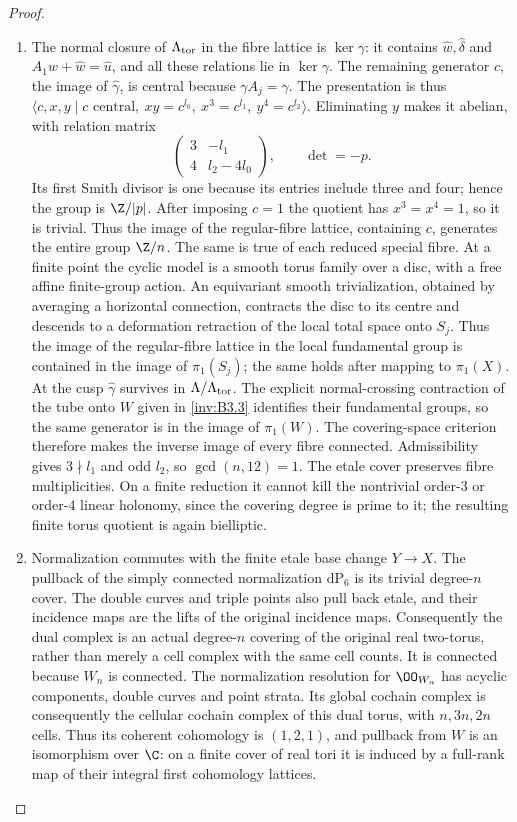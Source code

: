 \begin{proof}
\begin{enumerate}[label=\arabic*.,leftmargin=*]
\item The normal closure of $\Lambda_{\rm tor}$ in the fibre lattice is
$\ker\gamma$: it contains $\hat w,\hat\delta$ and
$A_1\hat w+\hat w=\hat u$, and all these relations lie in
$\ker\gamma$. The remaining generator $c$, the image of
$\hat\gamma$, is central because $\gamma A_j=\gamma$.
The presentation is thus
$\langle c,x,y\mid c\text{ central},\ xy=c^{l_0},\
x^3=c^{l_1},\ y^4=c^{l_2}\rangle$.
Eliminating $y$ makes it abelian, with relation matrix
\[
 \begin{pmatrix}3&-l_1\\4&l_2-4l_0\end{pmatrix},
 \qquad\det=-p.
\]
Its first Smith divisor is one because its entries include three
and four; hence the group is $\Z/|p|$.
After imposing $c=1$ the quotient has $x^3=x^4=1$, so it is trivial.
Thus the image of the regular-fibre lattice, containing $c$, generates
the entire group $\Z/n$. The same is true of each reduced special
fibre. At a finite point the cyclic model is a smooth torus family
over a disc, with a free affine finite-group action. An equivariant
smooth trivialization, obtained by averaging a horizontal connection,
contracts the disc to its centre and descends to a deformation
retraction of the local total space onto $S_j$. Thus the image of
the regular-fibre lattice in the local fundamental group is contained
in the image of $\pi_1(S_j)$; the same holds after mapping to
$\pi_1(X)$. At the cusp $\hat\gamma$ survives in
$\Lambda/\Lambda_{\rm tor}$. The explicit normal-crossing contraction
of the tube onto $W$ given in \ref{inv:B3.3} identifies their fundamental groups,
so the same generator is in the image of $\pi_1(W)$.
The covering-space criterion therefore makes the inverse image of
every fibre connected. Admissibility gives $3\nmid l_1$ and odd $l_2$,
so $\gcd(n,12)=1$. The etale cover preserves fibre multiplicities.
On a finite reduction it cannot kill the nontrivial order-$3$ or
order-$4$ linear holonomy, since the covering degree is prime to it;
the resulting finite torus quotient is again bielliptic.

\item Normalization commutes with the finite etale base change $Y\to X$.
The pullback of the simply connected normalization $\mathrm{dP}_6$
is its trivial degree-$n$ cover. The double curves and triple points
also pull back etale, and their incidence maps are the lifts of the
original incidence maps. Consequently the dual complex is an actual
degree-$n$ covering of the original real two-torus, rather than merely
a cell complex with the same cell counts. It is connected because
$W_n$ is connected. The normalization resolution for $\OO_{W_n}$
has acyclic components, double curves and point strata. Its global
cochain complex is consequently the cellular cochain complex of this
dual torus, with $n,3n,2n$ cells. Thus its coherent cohomology is
$(1,2,1)$, and pullback from $W$ is an isomorphism over $\C$:
on a finite cover of real tori it is induced by a full-rank map of
their integral first cohomology lattices.


\end{enumerate}
\end{proof}
